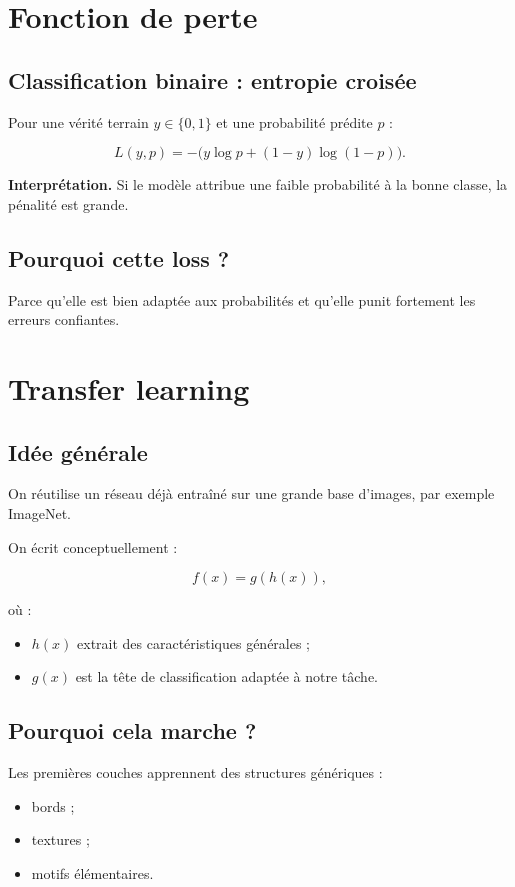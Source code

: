 ﻿\documentclass[11pt,a4paper]{article}
\begin{document}
\section{Fonction de perte}

\subsection{Classification binaire : entropie croisée}

Pour une vérité terrain $y \in \{0,1\}$ et une probabilité prédite $p$ :

\[
L(y,p) = -\bigl(y\log p + (1-y)\log(1-p)\bigr).
\]

\textbf{Interprétation.}  
Si le modèle attribue une faible probabilité à la bonne classe, la pénalité est grande.

\subsection{Pourquoi cette loss ?}

Parce qu’elle est bien adaptée aux probabilités et qu’elle punit fortement les erreurs confiantes.

\section{Transfer learning}

\subsection{Idée générale}

On réutilise un réseau déjà entraîné sur une grande base d’images,
par exemple ImageNet.

On écrit conceptuellement :

\[
f(x)=g(h(x)),
\]

où :
\begin{itemize}
    \item $h(x)$ extrait des caractéristiques générales ;
    \item $g(x)$ est la tête de classification adaptée à notre tâche.
\end{itemize}

\subsection{Pourquoi cela marche ?}

Les premières couches apprennent des structures génériques :
\begin{itemize}
    \item bords ;
    \item textures ;
    \item motifs élémentaires.
\end{itemize}
\end{document}
